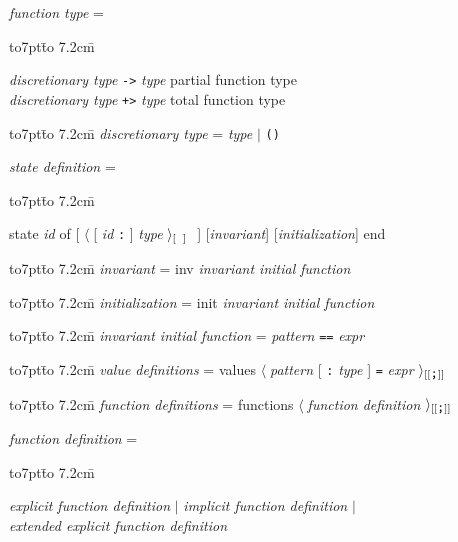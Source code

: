 \documentclass[a4paper]{jsarticle}
\newcommand{\K}[1]{{\sf #1}}
\newcommand{\id}[1]{{\it #1\/}}
\newcommand{\AL}{$\langle\;$}
\newcommand{\AR}[1]{$\rangle_{[\hbox{\tt#1}]}\;$}
\newcommand{\ARX}[1]{$\rangle_{[[\hbox{\tt#1}]]}\;$}
\newcommand{\lp}{{\tt(}}
\newcommand{\rp}{{\tt)}}
\newcommand{\RMor}{{$|$}}
\newenvironment{tabbingone}[0]{
\begingroup
  \parskip=0pt
  \topsep=0pt
  \partopsep=0pt
  \begin{tabbing}
    \hbox to7pt{}\=%
    \hbox to 7.2cm{}\=%
    \kill
    \+ %
    \kill
}{
  \end{tabbing}
\endgroup}
\begin{document}
\id{function type} =
\begin{tabbingone}
  \id{discretionary type} {\tt->} \id{type}                \> partial function type \\
  \id{discretionary type} {\tt+>} \id{type}                \> total function type \\
\end{tabbingone}

\begin{tabbingone}\-\kill
\id{discretionary type} =
  \id{type} \RMor{} \lp\rp  \\
\end{tabbingone}

\id{state definition} =
\begin{tabbingone}
  \K{state} \id{id} \K{of} [ \AL [ \id{id} {\tt:} ] \id{type} \AR{\ } ] 
  {}[\id{invariant}] [\id{initialization}] \K{end} \\
\end{tabbingone}

\begin{tabbingone}\-\kill
\id{invariant} = 
  \K{inv} \id{invariant initial function} \\
\end{tabbingone}

\begin{tabbingone}\-\kill
\id{initialization} = 
  \K{init} \id{invariant initial function} \\
\end{tabbingone}

\begin{tabbingone}\-\kill
\id{invariant initial function} =
  \id{pattern} {\tt==} \id{expr} \\
\end{tabbingone}

\begin{tabbingone}\-\kill
\id{value definitions} =
  \K{values} \AL \id{pattern} [ {\tt:} \id{type} ] {\tt=} \id{expr} \ARX{;} \\
\end{tabbingone}

\begin{tabbingone}\-\kill
\id{function definitions} =  
  \K{functions} \AL \id{function definition} \ARX{;}  \\
\end{tabbingone}

\id{function definition} = 
\begin{tabbingone}
  \id{explicit function definition} \RMor{}
  \id{implicit function definition} \RMor{}\\
  \id{extended explicit function definition}\\
\end{tabbingone}
\end{document}
